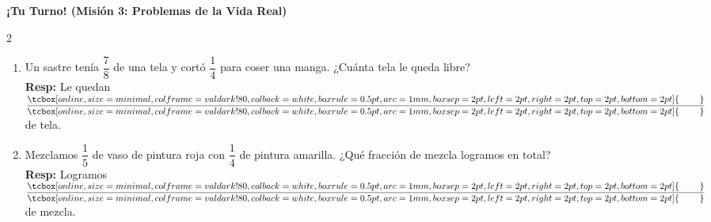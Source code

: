 \documentclass[12pt, letterpaper]{article}
\newenvironment{practica}[1]{
	\vspace{0.6cm}
	\begin{tcolorbox}[colback=white, colframe=valdark, boxrule=1pt, borderline west={4pt}{0pt}{valdark!50}, arc=2mm, top=3pt, bottom=3pt]
		\large\bfseries \ding{46} \textbf{¡Tu Turno! (#1)}
	\end{tcolorbox}
	\vspace{0.2cm}
}{
	\vspace{0.4cm}
}
\newcommand{\finunidad}[1]{
	\vspace{0.6cm}
	\begin{center}
		\begin{tcolorbox}[colback=valred!5, colframe=valred, width=14cm, arc=3mm, boxrule=2pt]
			\centering \Huge \textbf{\ding{55} ¡ALTO AQUÍ!} \\[0.4cm]
			\Large \textbf{FIN DE LA UNIDAD #1}\\[0.2cm]
			\large \textit{Has completado las misiones de este tema.}\\
			\normalsize Repasa tus respuestas y avisa a tu profesor. \textbf{¡Prepárate para tu evaluación!}
		\end{tcolorbox}
	\end{center}
}
\newcommand{\boxfill}[1][0.6cm]{\tcbox[on line, size=minimal, colframe=valdark!80, colback=white, boxrule=0.5pt, arc=1mm, boxsep=2pt, left=2pt, right=2pt, top=2pt, bottom=2pt]{\makebox[#1]{\vphantom{M}}}}
\begin{document}
\begin{practica}{Misión 3: Problemas de la Vida Real}
\begin{multicols}{2}
\begin{enumerate}[itemsep=1cm, leftmargin=*]
				\item Un sastre tenía $\dfrac{7}{8}$ de una tela y cortó $\dfrac{1}{4}$ para coser una manga. ¿Cuánta tela le queda libre? \\
				\textbf{Resp:} Le quedan $\dfrac{\boxfill[0.8cm]}{\boxfill[0.8cm]}$ de tela.
				
				\item Mezclamos $\dfrac{1}{5}$ de vaso de pintura roja con $\dfrac{1}{4}$ de pintura amarilla. ¿Qué fracción de mezcla logramos en total? \\
				\textbf{Resp:} Logramos $\dfrac{\boxfill[0.8cm]}{\boxfill[0.8cm]}$ de mezcla.
				
			\end{enumerate}
		\end{multicols}
	\end{practica}
	
	
\end{document}
